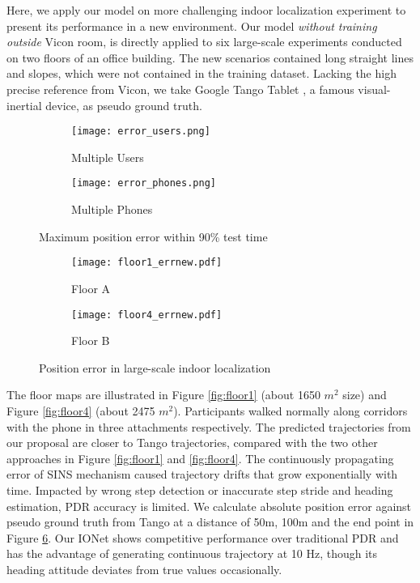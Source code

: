 \documentclass[letterpaper]{article}
\begin{document}
	Here, we apply our model on more challenging indoor localization experiment to present its performance in a new environment. Our model \textit{without training outside} Vicon room, is directly applied to six large-scale experiments conducted on two floors of an office building. The new scenarios contained long straight lines and slopes, which were not contained in the training dataset. Lacking the high precise reference from Vicon, we take Google Tango Tablet \cite{Tango}, a famous visual-inertial device, as pseudo ground truth.
  
     \begin{figure}
    	\centering
        \begin{subfigure}[t]{0.23\textwidth}
        	\texttt{[image: error\_users.png]}
        	\caption{\label{fig:error_users} Multiple Users}
        \end{subfigure}
        \begin{subfigure}[t]{0.23\textwidth}
        	\texttt{[image: error\_phones.png]}
        	\caption{\label{fig:error_phones} Multiple Phones}
        \end{subfigure}
        \caption{\label{fig:small_error}Maximum position error within 90\% test time}
    \end{figure}

 	\begin{figure}
    	\centering
        \begin{subfigure}[t]{0.23\textwidth}
        	\texttt{[image: floor1\_errnew.pdf]}
        	\caption{\label{fig:floor1_err} Floor A}
        \end{subfigure}
        \begin{subfigure}[t]{0.23\textwidth}
        	\texttt{[image: floor4\_errnew.pdf]}
        	\caption{\label{fig:floor4_err} Floor B}
        \end{subfigure}
        \caption{\label{fig:large_error} Position error in large-scale indoor localization}
    \end{figure}

    The floor maps are illustrated in Figure \ref{fig:floor1} (about 1650 $m^2$ size) and Figure \ref{fig:floor4} (about 2475 $m^2$). Participants walked normally along corridors with the phone in three attachments respectively. The predicted trajectories from our proposal are closer to Tango trajectories, compared with the two other approaches in Figure \ref{fig:floor1} and \ref{fig:floor4}. The continuously propagating error of SINS mechanism caused trajectory drifts that grow exponentially with time. Impacted by wrong step detection or inaccurate step stride and heading estimation, PDR accuracy is limited. We calculate absolute position error against pseudo ground truth from Tango at a distance of 50m, 100m and the end point in Figure \ref{fig:large_error}. Our IONet shows competitive performance over traditional PDR and has the advantage of generating continuous trajectory at 10 Hz, though its heading attitude deviates from true values occasionally.
\end{document}
